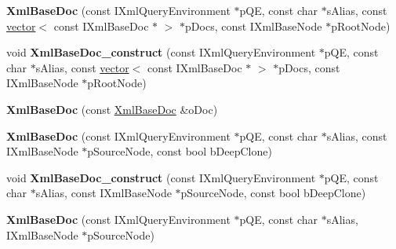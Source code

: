 \begin{DoxyCompactItemize}
\item 
\hypertarget{classgeneral__server_1_1XmlBaseDoc_af0c2d735d3764d58df64fc896554241d}{{\bfseries \-Xml\-Base\-Doc} (const \-I\-Xml\-Query\-Environment $\ast$p\-Q\-E, const char $\ast$s\-Alias, const \hyperlink{classvector}{vector}$<$ const \-I\-Xml\-Base\-Doc $\ast$ $>$ $\ast$p\-Docs, const \-I\-Xml\-Base\-Node $\ast$p\-Root\-Node)}\label{classgeneral__server_1_1XmlBaseDoc_af0c2d735d3764d58df64fc896554241d}

\item 
\hypertarget{classgeneral__server_1_1XmlBaseDoc_aea8438e35f1dc61d407960cfca88f34c}{void {\bfseries \-Xml\-Base\-Doc\-\_\-construct} (const \-I\-Xml\-Query\-Environment $\ast$p\-Q\-E, const char $\ast$s\-Alias, const \hyperlink{classvector}{vector}$<$ const \-I\-Xml\-Base\-Doc $\ast$ $>$ $\ast$p\-Docs, const \-I\-Xml\-Base\-Node $\ast$p\-Root\-Node)}\label{classgeneral__server_1_1XmlBaseDoc_aea8438e35f1dc61d407960cfca88f34c}

\item 
\hypertarget{classgeneral__server_1_1XmlBaseDoc_ac5c1107d9f36d42bb18a4089705618d8}{{\bfseries \-Xml\-Base\-Doc} (const \hyperlink{classgeneral__server_1_1XmlBaseDoc}{\-Xml\-Base\-Doc} \&o\-Doc)}\label{classgeneral__server_1_1XmlBaseDoc_ac5c1107d9f36d42bb18a4089705618d8}

\item 
\hypertarget{classgeneral__server_1_1XmlBaseDoc_a6719e11ca75bf2b374a6b22a5682c87d}{{\bfseries \-Xml\-Base\-Doc} (const \-I\-Xml\-Query\-Environment $\ast$p\-Q\-E, const char $\ast$s\-Alias, const \-I\-Xml\-Base\-Node $\ast$p\-Source\-Node, const bool b\-Deep\-Clone)}\label{classgeneral__server_1_1XmlBaseDoc_a6719e11ca75bf2b374a6b22a5682c87d}

\item 
\hypertarget{classgeneral__server_1_1XmlBaseDoc_a1238be54379392126748d3b22bdf2b96}{void {\bfseries \-Xml\-Base\-Doc\-\_\-construct} (const \-I\-Xml\-Query\-Environment $\ast$p\-Q\-E, const char $\ast$s\-Alias, const \-I\-Xml\-Base\-Node $\ast$p\-Source\-Node, const bool b\-Deep\-Clone)}\label{classgeneral__server_1_1XmlBaseDoc_a1238be54379392126748d3b22bdf2b96}

\item 
\hypertarget{classgeneral__server_1_1XmlBaseDoc_aa45c5e1523b8da1b3d0d21a1b53e9e60}{{\bfseries \-Xml\-Base\-Doc} (const \-I\-Xml\-Query\-Environment $\ast$p\-Q\-E, const char $\ast$s\-Alias, \-I\-Xml\-Base\-Node $\ast$p\-Source\-Node)}\label{classgeneral__server_1_1XmlBaseDoc_aa45c5e1523b8da1b3d0d21a1b53e9e60}


\end{DoxyCompactItemize}
